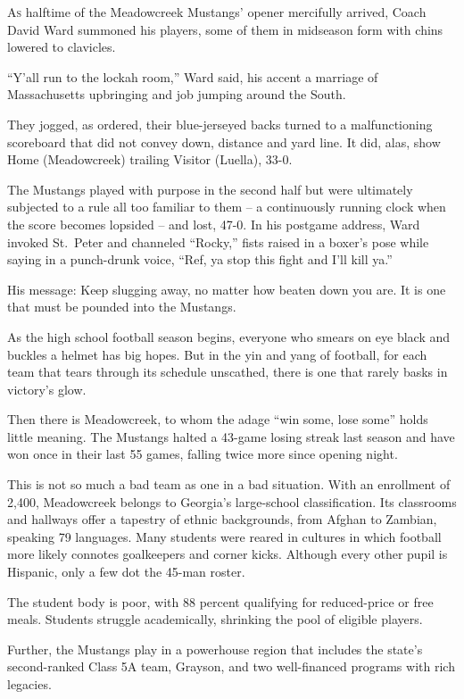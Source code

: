﻿\documentclass[12pt]{article}
\begin{document}
\lettrine{A}{s} halftime of the Meadowcreek Mustangs' opener mercifully arrived, Coach David Ward
summoned\cite{summon} his players, some of them in midseason form with chins lowered to
clavicles\cite{clavicle}.

``Y'all run to the lockah room,'' Ward said, his accent a marriage of Massachusetts upbringing and
job jumping around the South.

They jogged, as ordered, their blue-jerseyed backs turned to a malfunctioning scoreboard that did
not convey down, distance and yard line. It did, alas, show Home (Meadowcreek) trailing Visitor
(Luella), 33-0.

The Mustangs\cite{mustang} played with purpose in the second half but were ultimately subjected to a
rule all too familiar to them -- a continuously running clock when the score becomes lopsided -- and
lost, 47-0. In his postgame address, Ward invoked St.~Peter and channeled ``Rocky,'' fists raised in
a boxer's pose while saying in a punch-drunk voice, ``Ref, ya stop this fight and I'll kill ya.''

His message: Keep slugging\cite{slug} away, no matter how beaten down you are. It is one that must
be pounded into the Mustangs.

As the high school football season begins, everyone who smears on eye black and buckles a helmet has
big hopes. But in the yin and yang of football, for each team that tears through its schedule
unscathed, there is one that rarely basks\cite{bask} in victory's glow.

Then there is Meadowcreek, to whom the adage\cite{adage} ``win some, lose some'' holds little
meaning. The Mustangs halted a 43-game losing streak last season and have won once in their last 55
games, falling twice more since opening night.

This is not so much a bad team as one in a bad situation. With an enrollment of 2,400, Meadowcreek
belongs to Georgia's large-school classification. Its classrooms and hallways offer a
tapestry\cite{tapestry} of ethnic backgrounds, from Afghan to Zambian, speaking 79 languages. Many
students were reared in cultures in which football more likely connotes goalkeepers and corner
kicks. Although every other pupil\cite{pupil} is Hispanic, only a few dot the 45-man roster.

The student body is poor, with 88 percent qualifying for reduced-price or free meals. Students
struggle academically, shrinking the pool of eligible players.

Further, the Mustangs play in a powerhouse region that includes the state's second-ranked Class 5A
team, Grayson, and two well-financed programs with rich legacies.
\end{document}
